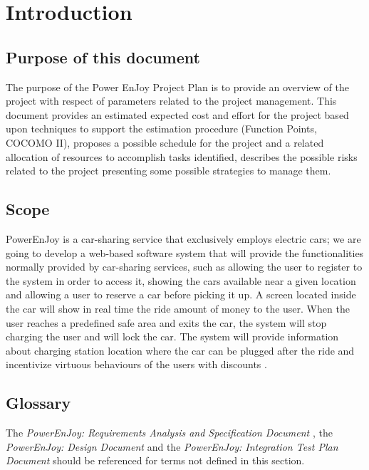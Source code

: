 \section{Introduction}

\subsection{Purpose of this document}
The purpose of the Power EnJoy Project Plan is to provide an overview of the project with respect of parameters related to the project management. This document provides an estimated expected cost and effort for the project based upon techniques to support the estimation
procedure (Function Points, COCOMO II), proposes a possible schedule for the project and a related allocation of resources to accomplish tasks identified, describes the possible risks related to the project presenting some possible strategies to manage them.


\subsection{Scope}
PowerEnJoy is a car-sharing service that exclusively employs electric cars; we are going to develop a web-based software system that will provide the functionalities normally provided by car-sharing services, such as allowing the user to register to the system in order to access it, showing the cars available near a given location and allowing a user to reserve a car before picking it up.
A screen located inside the car will show in real time the ride amount of money to the user. When the user reaches a predefined safe area and exits the car, the system will stop charging the user and will lock the car. The system will provide information about charging station location where the car can be plugged after the ride and incentivize virtuous behaviours of the users with discounts \cite{RASD}.

\subsection{Glossary}
The \emph{PowerEnJoy: Requirements Analysis and Specification Document} \cite{RASD}, the \emph{PowerEnJoy: Design Document} \cite{DD} and the \emph{PowerEnJoy: Integration Test Plan Document} \cite{ITPD} should be referenced for terms not defined in this section.

